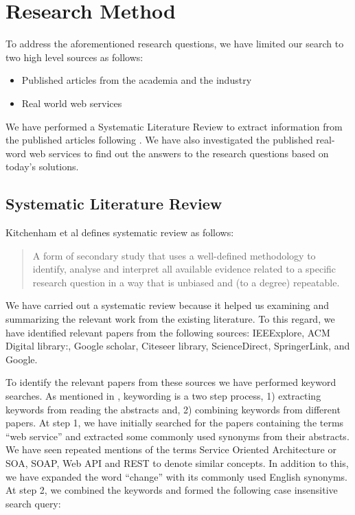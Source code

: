 \documentclass[runningheads,a4paper]{llncs}
\begin{document}
\section{Research Method} %
\label{sec:research_method}

To address the aforementioned research questions, we have limited our search to two high level sources as follows:

\begin{itemize}
  \item Published articles from the academia and the industry
  \item Real world web services
\end{itemize}

We have performed a Systematic Literature Review to extract information from the published articles following \cite{kitchenham2007guidelines}. We have also investigated the published real-word web services to find out the answers to the research questions based on today’s solutions.

\subsection{Systematic Literature Review} %
\label{sub:systematic_literature_review}
Kitchenham et al defines systematic review as follows:

\begin{quote}
A form of secondary study that uses a well-defined methodology to identify, analyse and interpret all available evidence related to a specific research question in a way that is unbiased and (to a degree) repeatable.
\end{quote}
We have carried out a systematic review because it helped us examining and summarizing the relevant work from the existing literature. To this regard, we have identified relevant papers from the following sources: IEEExplore, ACM Digital library:, Google scholar, Citeseer library, ScienceDirect, SpringerLink, and Google.

To identify the relevant papers from these sources we have performed keyword searches. As mentioned in \cite{petersen2008systematic}, keywording is a two step process, 1) extracting keywords from reading the abstracts and, 2) combining keywords from different papers. At step 1, we have initially searched for the papers containing the terms ``web service'' and extracted some commonly used synonyms from their abstracts. We have seen repeated mentions of the terms Service Oriented Architecture or SOA, SOAP, Web API and REST to denote similar concepts. In addition to this, we have expanded the word ``change'' with its commonly used English synonyms. At step 2, we combined the keywords and formed the following case insensitive search query:
\end{document}
